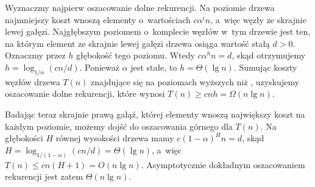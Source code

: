Wyznaczmy najpierw oszacowanie dolne rekurencji.
Na  poziomie drzewa najmniejszy koszt wnoszą elementy o~wartościach $c\alpha^in$, a~więc węzły ze skrajnie lewej gałęzi.
Najgłębszym poziomem o~komplecie węzłów w~tym drzewie jest ten, na którym element ze skrajnie lewej gałęzi drzewa osiąga wartość stałą $d>0$.
Oznaczmy przez $h$ głębokość tego poziomu.
Wtedy $c\alpha^hn=d$, skąd otrzymujemy $h=\log_{1/\alpha}(cn/d)$.
Ponieważ $\alpha$ jest stałe, to $h=\Theta(\lg n)$.
Sumując koszty węzłów drzewa $T(n)$ znajdujące się na poziomach wyższych niż , uzyskujemy oszacowanie dolne rekurencji, które wynosi $T(n)\ge cnh=\Omega(n\lg n)$.

Badając teraz skrajnie prawą gałąź, której elementy wnoszą największy koszt na każdym poziomie, możemy dojść do oszacowania górnego dla $T(n)$.
Na głębokości $H$ równej wysokości drzewa mamy $c(1-\alpha)^Hn=d$, skąd $H=\log_{1/(1-\alpha)}(cn/d)=\Theta(\lg n)$, a~więc $T(n)\le cn(H+1)=O(n\lg n)$.
Asymptotycznie dokładnym oszacowaniem rekurencji jest zatem $\Theta(n\lg n)$.
